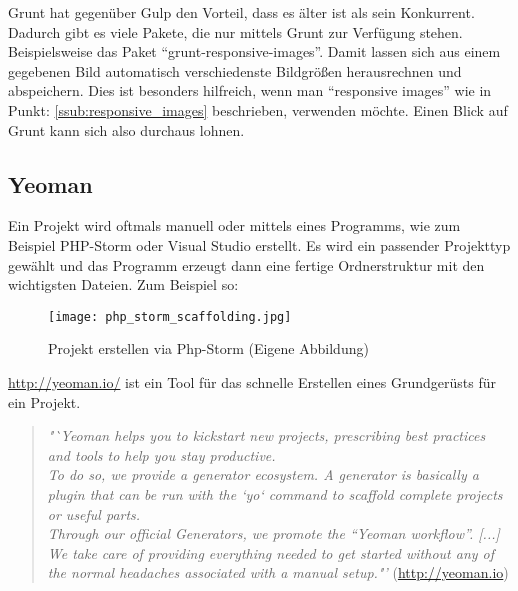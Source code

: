 		Grunt hat gegenüber Gulp den Vorteil, dass es älter ist als sein Konkurrent. Dadurch gibt es viele Pakete, die nur mittels Grunt zur Verfügung stehen. Beispielsweise das Paket "`grunt-responsive-images"'. Damit lassen sich aus einem gegebenen Bild automatisch verschiedenste Bildgrößen herausrechnen und abspeichern. Dies ist besonders hilfreich, wenn man "`responsive images"' wie in Punkt: \ref{ssub:responsive_images} beschrieben, verwenden möchte. Einen Blick auf Grunt kann sich also durchaus lohnen.\\
		
	\pagebreak

	\subsection{Yeoman} %
	\label{sub:yeoman}
		Ein Projekt wird oftmals manuell oder mittels eines Programms, wie zum Beispiel PHP-Storm oder Visual Studio erstellt. Es wird ein passender Projekttyp gewählt und das Programm erzeugt dann eine fertige Ordnerstruktur mit den wichtigsten Dateien. Zum Beispiel so:

		\begin{figure}[htbp]
			\begin{center}
				\texttt{[image: php\_storm\_scaffolding.jpg]}
				\caption{Projekt erstellen via Php-Storm (Eigene Abbildung)}
				\label{fig:php_storm_scaffolding}
			\end{center}
		\end{figure}
		
		\url{http://yeoman.io/} ist ein Tool für das schnelle Erstellen eines Grundgerüsts für ein Projekt.

		\begin{quote}
			\textit{"`Yeoman helps you to kickstart new projects, prescribing best practices and tools to help you stay productive.\\
			To do so, we provide a generator ecosystem. A generator is basically a plugin that can be run with the `yo` command to scaffold complete projects or useful parts.\\
			Through our official Generators, we promote the "`Yeoman workflow"'. [...] We take care of providing everything needed to get started without any of the normal headaches associated with a manual setup."'} (\url{http://yeoman.io})
		\end{quote}

